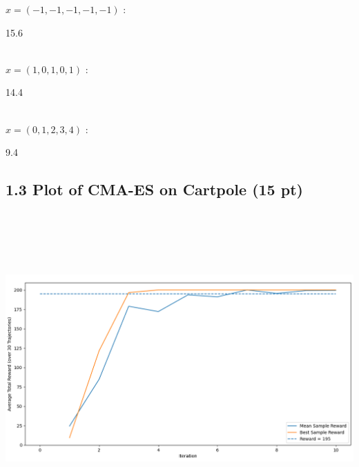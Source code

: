 \documentclass[12pt]{article}
\begin{document}
$x = (-1, -1, -1, -1, -1)$ : \begin{tcolorbox}[fit,height=1cm, width=5cm, blank, borderline={1pt}{1pt},nobeforeafter]
    \begin{center}
    \vspace{3mm}
    \large{15.6}
    \end{center}
\end{tcolorbox} \\
$x = (1, 0, 1, 0, 1)$ : \hspace{3.5em} \begin{tcolorbox}[fit,height=1cm, width=5cm, blank, borderline={1pt}{1pt},nobeforeafter]
    \begin{center}
    \vspace{3mm}
    \large{14.4}
    \end{center}
\end{tcolorbox} \\
$x = (0, 1, 2, 3, 4)$ : \hspace{3.5em} \begin{tcolorbox}[fit,height=1cm, width=5cm, blank, borderline={1pt}{1pt},nobeforeafter]
    \begin{center}
    \vspace{3mm}
    \large{9.4}
    \end{center}
\end{tcolorbox}

\subsection*{1.3 Plot of CMA-ES on Cartpole (15 pt)}
\begin{tcolorbox}[fit,height=30em, width=40em, blank, borderline={1pt}{1pt},nobeforeafter]
    \begin{center}
    \vspace*{0.4cm}\includegraphics[height= 12cm, width=15.5cm]{q1-3}
    \end{center}
    \end{tcolorbox}
    
\end{document}
